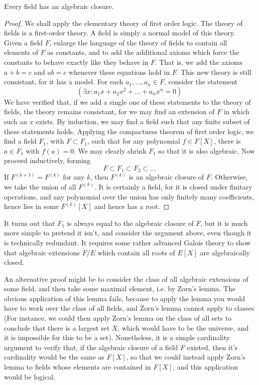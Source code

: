\begin{theorem}
    Every field has an algebraic closure.
\end{theorem}
\begin{proof}
    We shall apply the elementary theory of first order logic. The theory of fields is a first-order theory. A field is simply a normal model of this theory. Given a field $F$, enlarge the language of the theory of fields to contain all elements of $F$ as constants, and to add the additional axioms which force the constants to behave exactly like they behave in $F$. That is, we add the axioms $a + b = c$ and $ab = c$ whenever these equations hold in $F$. This new theory is still consistant, for it has a model. For each $a_1, \dots, a_n \in F$, consider the statement
    \[ (\exists x: a_1 x + a_2 x^2 + \dots + a_n x^n = 0) \]
    We have verified that, if we add a single one of these statements to the theory of fields, the theory remains consistant, for we may find an extension of $F$ in which such an $x$ exists. By induction, we may find a field such that any finite subset of these statements holds. Applying the compactness theorem of first order logic, we find a field $F_1$, with $F \subset F_1$, such that for any polynomial $f \in F[X]$, there is $a \in F_1$ with $f(a) = 0$. We may clearly shrink $F_1$ so that it is also algebraic. Now proceed inductively, forming
    \[ F \subset F_1 \subset F_2 \subset \dots \]
    If $F^{(k+1)} = F^{(k)}$ for any $k$, then $F^{(k)}$ is an algebraic closure of $F$. Otherwise, we take the union of all $F^{(k)}$. It is certainly a field, for it is closed under finitary operations, and any polynomial over the union has only finitely many coefficients, hence lies in some $F^{(k)}[X]$ and hence has a root.
\end{proof}

\begin{remark}
	It turns out that $F_1$ is always equal to the algebraic closure of $F$, but it is much more simple to pretend it isn't, and consider the argument above, even though it is technically redundant. It requires some rather advanced Galois theory to show that algebraic extensions $F/E$ which contain all roots of $E[X]$ are algebraically closed.
\end{remark}

An alternative proof might be to consider the class of all algebraic extensions of some field, and then take some maximal element, i.e. by Zorn's lemma. The obvious application of this lemma fails, because to apply the lemma you would have to work over the class of all fields, and Zorn's lemma cannot apply to classes (For instance, we could then apply Zorn's lemma on the class of all sets to conclude that there is a largest set $X$, which would have to be the universe, and it is impossible for this to be a set). Nonetheless, it is a simple cardinality argument to verify that, if the algebraic closure of a field $F$ existed, then it's cardinality would be the same as $F[X]$, so that we could instead apply Zorn's lemma to fields whose elements are contained in $F[X]$, and this application would be logical.

